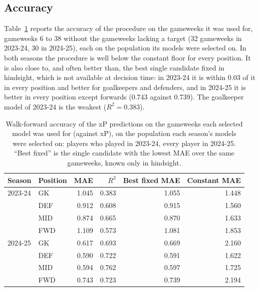 \subsection{Accuracy}
\label{sec:predictions-accuracy}

Table~\ref{tab:predictor-mae} reports the accuracy of the procedure on the gameweeks it was
used for, gameweeks 6 to 38 without the gameweeks lacking a target (32 gameweeks in 2023-24, 30
in 2024-25), each on the population its models were selected on. In both seasons the procedure
is well below the constant floor for every position. It is also close to, and often better
than, the best single candidate fixed in hindsight, which is not available at decision time:
in 2023-24 it is within 0.03 of it in every position and better for goalkeepers and defenders,
and in 2024-25 it is better in every position except forwards (0.743 against 0.739). The
goalkeeper model of 2023-24 is the weakest ($R^2=0.383$).

\begin{table}[ht]
  \centering
  \caption{Walk-forward accuracy of the xP predictions on the gameweeks each selected model was
  used for (against xP), on the population each season's models were selected on: players who
  played in 2023-24, every player in 2024-25. ``Best fixed'' is the single candidate with the
  lowest MAE over the same gameweeks, known only in hindsight.}
  \label{tab:predictor-mae}
  \begin{tabular}{llrrrr}
    \toprule
    Season & Position & MAE & $R^2$ & Best fixed MAE & Constant MAE \\
    \midrule
    2023-24 & GK  & 1.045 & 0.383 & 1.055 & 1.448 \\
            & DEF & 0.912 & 0.608 & 0.915 & 1.560 \\
            & MID & 0.874 & 0.665 & 0.870 & 1.633 \\
            & FWD & 1.109 & 0.573 & 1.081 & 1.853 \\
    \midrule
    2024-25 & GK  & 0.617 & 0.693 & 0.669 & 2.160 \\
            & DEF & 0.590 & 0.722 & 0.591 & 1.622 \\
            & MID & 0.594 & 0.762 & 0.597 & 1.725 \\
            & FWD & 0.743 & 0.723 & 0.739 & 2.194 \\
    \bottomrule
  \end{tabular}
\end{table}


